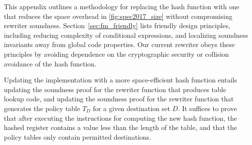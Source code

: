 This appendix outlines a methodology for replacing the hash function with one that reduces the space overhead in \autoref{fig:spec2017_size} without compromising rewriter soundness.
Section~\ref{sec:fm_friendly} lists \FM friendly design principles, including reducing complexity of conditional expressions, and localizing soundness invariants away from global code properties.
Our current rewriter obeys these principles by avoiding dependence on the cryptographic security or collision avoidance of the hash function.

Updating the implementation with a more space-efficient hash function entails
updating the soundness proof for the rewriter function that produces table lookup code,
and updating the soundness proof for the rewriter function that generates the policy table $T_D$ for a given destination set $D$.
It suffices to prove that after executing the instructions for computing the new hash function,
the hashed register contains a value less than the length of the table, and that the policy tables only contain permitted destinations.

